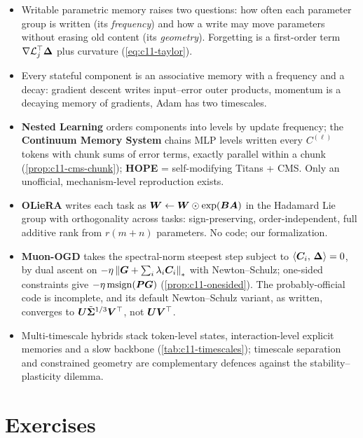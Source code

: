 \begin{summarybox}
\begin{itemize}
  \item Writable parametric memory raises two questions: how often each parameter group is written
  (its \emph{frequency}) and how a write may move parameters without erasing old content (its
  \emph{geometry}). Forgetting is a first-order term $\nabla\mathcal{L}_j^{\top}\bm{\Delta}$ plus curvature
  (\cref{eq:c11-taylor}).
  \item Every stateful component is an associative memory with a frequency and a decay: gradient
  descent writes input--error outer products, momentum is a decaying memory of gradients, Adam has
  two timescales.
  \item \textbf{Nested Learning} orders components into levels by update frequency; the
  \textbf{Continuum Memory System} chains MLP levels written every $C^{(\ell)}$ tokens with chunk sums
  of error terms, exactly parallel within a chunk (\cref{prop:c11-cms-chunk}); \textbf{HOPE} =
  self-modifying Titans + CMS. Only an unofficial, mechanism-level reproduction exists.
  \item \textbf{OLieRA} writes each task as $\bm{W} \leftarrow \bm{W}\odot\exp(\bm{B}\bm{A})$ in the Hadamard Lie
  group with orthogonality across tasks: sign-preserving, order-independent, full additive rank from
  $r(m+n)$ parameters. No code; our formalization.
  \item \textbf{Muon-OGD} takes the spectral-norm steepest step subject to $\left\langle \bm{C}_i,\, \bm{\Delta}\right\rangle = 0$,
  by dual ascent on $-\eta\left\lVert \bm{G} + \sum_i\lambda_i\bm{C}_i\right\rVert_*$ with Newton--Schulz; one-sided
  constraints give $-\eta\operatorname{msign}(\bm{P}\bm{G})$ (\cref{prop:c11-onesided}). The probably-official
  code is incomplete, and its default Newton--Schulz variant, as written, converges to
  $\bm{U}\tilde{\bm{\Sigma}}^{1/3}\bm{V}^{\top}$, not $\bm{U}\bm{V}^{\top}$.
  \item Multi-timescale hybrids stack token-level states, interaction-level explicit memories and a
  slow backbone (\cref{tab:c11-timescales}); timescale separation and constrained geometry are
  complementary defences against the stability--plasticity dilemma.
\end{itemize}
\end{summarybox}

\section*{Exercises}

